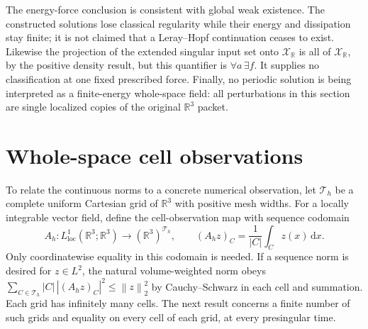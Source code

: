 \documentclass[11pt,a4paper]{article}
\theoremstyle{definition}\newtheorem{definition}[theorem]{Definition}
\theoremstyle{remark}\newtheorem{remark}[theorem]{Remark}
\newcommand{\R}{\mathbb R}\newcommand{\TT}{\mathbb T^3}
\newcommand{\dd}{\,\mathrm d}\newcommand{\eps}{\varepsilon}
\newcommand{\norm}[1]{\left\lVert#1\right\rVert}
\begin{document}
The energy-force conclusion is consistent with global weak existence. The constructed solutions lose classical regularity while their energy and dissipation stay finite; it is not claimed that a Leray--Hopf continuation ceases to exist. Likewise the projection of the extended singular input set onto $\mathcal X_{\R}$ is all of $\mathcal X_{\R}$, by the positive density result, but this quantifier is $\forall a\,\exists f$. It supplies no classification at one fixed prescribed force. Finally, no periodic solution is being interpreted as a finite-energy whole-space field: all perturbations in this section are single localized copies of the original $\R^3$ packet.


\section{Whole-space cell observations}\label{sec:grids}
To relate the continuous norms to a concrete numerical observation, let $\mathcal T_h$ be a complete uniform Cartesian grid of $\R^3$ with positive mesh widths. For a locally integrable vector field, define the cell-observation map with sequence codomain
\[
 A_h:L^1_{\mathrm{loc}}(\R^3;\R^3)\longrightarrow(\R^3)^{\mathcal T_h},
 \qquad (A_hz)_C=\frac1{|C|}\int_Cz(x)\dd x.
\]
Only coordinatewise equality in this codomain is needed. If a sequence norm is desired for $z\in L^2$, the natural volume-weighted norm obeys
$\sum_{C\in\mathcal T_h}|C|\,|(A_hz)_C|^2\le\norm{z}_2^2$
by Cauchy--Schwarz in each cell and summation. Each grid has infinitely many cells. The next result concerns a finite number of such grids and equality on every cell of each grid, at every presingular time.
\end{document}
